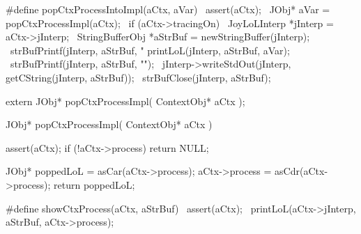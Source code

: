 #define popCtxProcessIntoImpl(aCtx, aVar)                       \
assert(aCtx);                                                   \
JObj* aVar = popCtxProcessImpl(aCtx);                           \
if (aCtx->tracingOn) {                                          \
  JoyLoLInterp *jInterp = aCtx->jInterp;                        \
  StringBufferObj *aStrBuf = newStringBuffer(jInterp);          \
  strBufPrintf(jInterp, aStrBuf, "%
  printLoL(jInterp, aStrBuf, aVar);                             \
  strBufPrintf(jInterp, aStrBuf, "\n");                         \
  jInterp->writeStdOut(jInterp, getCString(jInterp, aStrBuf));  \
  strBufClose(jInterp, aStrBuf);                                \
}
\stopCHeader

\setCHeaderStream{private}
\startCHeader
extern JObj* popCtxProcessImpl(
  ContextObj* aCtx
);
\stopCHeader
\setCHeaderStream{public}

\startCCode
JObj* popCtxProcessImpl(
  ContextObj* aCtx
) {
  assert(aCtx);
  if (!aCtx->process) return NULL;

  JObj* poppedLoL = asCar(aCtx->process);
  aCtx->process   = asCdr(aCtx->process);
  return poppedLoL;
}
\stopCCode

\startCHeader
#define showCtxProcess(aCtx, aStrBuf)              \
  assert(aCtx);                                    \
  printLoL(aCtx->jInterp, aStrBuf, aCtx->process); \
\stopCHeader

